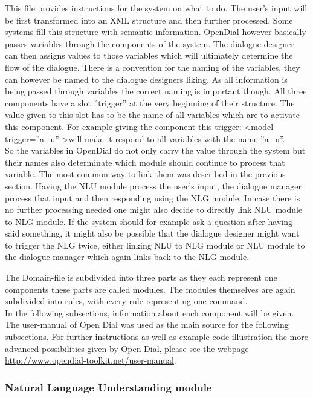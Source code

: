 \documentclass[a4paper, 12pt]{article}
\begin{document}
This file provides instructions for the system on what to do.
The user's input will be first transformed into an XML structure and then further processed.
Some systems fill this structure with semantic information. 
OpenDial however basically passes variables through the components of the system. 
The dialogue designer can then assigns values to those variables which will ultimately determine the flow of the dialogue. 
There is a convention for the naming of the variables, they can however be named to the dialogue designers liking. 
As all information is being passed through variables the correct naming is important though. 
All three components have a slot ”trigger” at the very beginning of their structure. 
The value given to this slot has to be the name of all variables which are to activate this component.
For example giving the component this trigger: 
\textless model trigger=”a\_u” \textgreater will make it respond to all variables with the name ”a\_u”. \\


So the variables in OpenDial do not only carry the value through the system but their names also determinate which module should continue to process that variable.
The most common way to link them was described in the previous section.
Having the NLU module process the user's input, the dialogue manager process that input and then responding using the NLG module.
In case there is no further processing needed one might also decide to directly link NLU module to NLG module. 
If the system should for example ask a question after having said something, it might also be possible that the dialogue designer might want to trigger the NLG twice, either linking NLU to NLG module or NLU module to the dialogue manager which again links back to the NLG module.


The Domain-file is subdivided into three parts as they each represent one components these parts are called modules. 
The modules themselves are again subdivided into rules, with every rule representing one command.\\

In the following subsections, information about each component will be given.
The user-manual of Open Dial \cite{OpenDial} was used as the main source for the following subsections.
For further instructions as well as example code illustration the more advanced possibilities given by Open Dial, please see the webpage \url{http://www.opendial-toolkit.net/user-manual}.

\subsubsection{Natural Language Understanding module}
\end{document}
